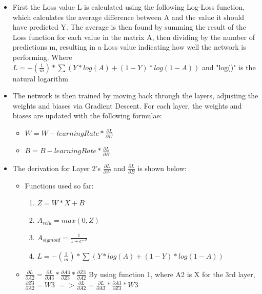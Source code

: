 \documentclass[./project-report/src/latex/project-report.tex]{subfiles}
\begin{document}
\begin{itemize}
    \item First the Loss value L is calculated using the following Log-Loss function, which calculates the average difference between A and the value it should have 
          predicted Y. The average is then found by summing the result of the Loss function for each value in the matrix A, then dividing by the number of predictions m, 
          resulting in a Loss value indicating how well the network is performing.
    	  Where $L = -(\frac{1}{m}) * \sum(Y * log(A) + (1-Y) * log(1-A))$ and "log()" is the natural logarithm
    \item The network is then trained by moving back through the layers, adjusting the weights and biases via Gradient Descent. For each layer, the weights and biases are 
		  updated with the following formulae:
    \begin{itemize}
        \item $W = W - learningRate * \frac{\partial{L}}{\partial{W}}$
        \item $B = B - learningRate * \frac{\partial{L}}{\partial{B}}$
    \end{itemize}
    \item The derivation for Layer 2's $\frac{\partial{L}}{\partial{W}}$ and $\frac{\partial{L}}{\partial{B}}$ is shown below:
    \begin{itemize}
        \item Functions used so far:
        \begin{enumerate}
            \item $Z = W * X + B$
            \item $A_{relu} = max(0, Z)$
            \item $A_{sigmoid} = \frac{1}{1+e^{-Z}}$
            \item $L = -(\frac{1}{m}) * \sum(Y * log(A) + (1-Y) * log(1-A))$
        \end{enumerate}
        \item $\frac{\partial{L}}{\partial{A2}} = \frac{\partial{L}}{\partial{A3}} * \frac{\partial{A3}}{\partial{Z3}} * \frac{\partial{Z3}}{\partial{A2}}$
              \vspace{1mm}
              \newline
              By using function 1, where A2 is X for the 3rd layer, $\frac{\partial{Z3}}{\partial{A2}} = W3$
              \vspace{1mm}
              \newline
              $=> \frac{\partial{L}}{\partial{A2}} =  \frac{\partial{L}}{\partial{A3}} * \frac{\partial{A3}}{\partial{Z3}} * W3$

\end{itemize}
\end{itemize}
\end{document}
